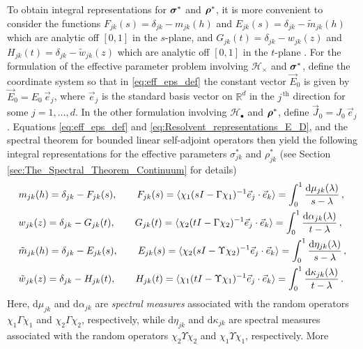 \documentclass{cmslatex}
\renewcommand{\d}{\text{d}}
\newcommand\bsig{\mbox{\boldmath${\sigma}$}}
\newcommand\brho{\mbox{\boldmath${\rho}$}}
\begin{document}
To obtain integral representations for $\bsig^*$ and
$\brho^*$, it is more convenient to consider the functions 
$F_{jk}(s)=\delta_{jk}-m_{jk}(h)$ and $E_{jk}(s)=\delta_{jk}-\tilde{m}_{jk}(h)$
which are analytic off $[0,1]$ in the $s$-plane, and
$G_{jk}(t)=\delta_{jk}-w_{jk}(z)$ and $H_{jk}(t)=\delta_{jk}-\tilde{w}_{jk}(z)$
which are analytic off $[0,1]$ in the $t$-plane
\cite{Golden:CMP-473}. For the formulation of the effective parameter
problem involving $\mathscr{H}_\times$ and $\bsig^*$, define the
coordinate system so that in \eqref{eq:eff_eps_def} the constant
vector $\vec{E}_0$ is given by $\vec{E}_0=E_0\,\vec{e}_j$, where
$\vec{e}_j$ is the standard basis vector on $\mathbb{R}^d$ in the
$j^{\,\text{th}}$ direction for some $j=1,\ldots,d$. In the other
formulation involving $\mathscr{H}_\bullet$ and $\brho^*$, define
$\vec{J}_0=J_0\,\vec{e}_j$. Equations \eqref{eq:eff_eps_def} and 
\eqref{eq:Resolvent_representations_E_D}, and the spectral theorem for
bounded linear self-adjoint operators \cite{Reed-1980,Stone:64} then
yield the following integral representations
\cite{Golden:CMP-473,Bergman:PRC-377,Bergman:AP-78,Murphy:JMP:063506}  
for the effective parameters $\sigma^*_{jk}$ and $\rho^*_{jk}$ (see Section
\ref{sec:The_Spectral_Theorem_Continuum} for details)
%
\begin{align}\label{eq:Stieltjes_F}
  &m_{jk}(h)=\delta_{jk}-F_{jk}(s), \qquad
  F_{jk}(s)=\langle\chi_1(sI-\Gamma\chi_1)^{-1}\vec{e}_j\cdot\vec{e}_k\rangle=\int_0^1\frac{\d\mu_{jk}(\lambda)}{s-\lambda}\,,
  \\
  &w_{jk}(z)=\delta_{jk}-G_{jk}(t), \qquad
  G_{jk}(t)=\langle\chi_2(tI-\Gamma\chi_2)^{-1}\vec{e}_j\cdot\vec{e}_k\rangle=\int_0^1\frac{\d\alpha_{jk}(\lambda)}{t-\lambda}\,,
  \notag \\
  &\tilde{m}_{jk}(h)=\delta_{jk}-E_{jk}(s), \qquad
  E_{jk}(s)=\langle\chi_2(sI-\Upsilon\chi_2)^{-1}\vec{e}_j\cdot\vec{e}_k\rangle=\int_0^1\frac{\d\eta_{jk}(\lambda)}{s-\lambda}\,,
  \notag \\
  &\tilde{w}_{jk}(z)=\delta_{jk}-H_{jk}(t), \qquad
  H_{jk}(t)=\langle\chi_1(tI-\Upsilon\chi_1)^{-1}\vec{e}_j\cdot\vec{e}_k\rangle=\int_0^1\frac{\d\kappa_{jk}(\lambda)}{t-\lambda}\,.
  \notag
\end{align}
%
Here, $\d\mu_{jk}$ and $\d\alpha_{jk}$ are \emph{spectral measures} associated
with the random operators $\chi_1\Gamma\chi_1$ and $\chi_2\Gamma\chi_2$, respectively, while
$\d\eta_{jk}$ and $\d\kappa_{jk}$ are spectral measures associated
with the random operators $\chi_2\Upsilon\chi_2$ and $\chi_1\Upsilon\chi_1$, respectively. More
\end{document}
